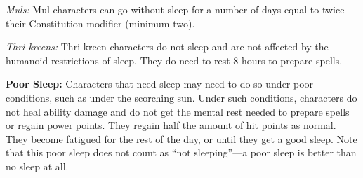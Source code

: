 \textit{Muls:} Mul characters can go without sleep for a number of days equal to twice their Constitution modifier (minimum two).

\textit{Thri-kreens:} Thri-kreen characters do not sleep and are not affected by the humanoid restrictions of sleep. They do need to rest 8 hours to prepare spells.

\textbf{Poor Sleep:} Characters that need sleep may need to do so under poor conditions, such as under the scorching sun. Under such conditions, characters do not heal ability damage and do not get the mental rest needed to prepare spells or regain power points. They regain half the amount of hit points as normal. They become fatigued for the rest of the day, or until they get a good sleep. Note that this poor sleep does not count as ``not sleeping''---a poor sleep is better than no sleep at all.
